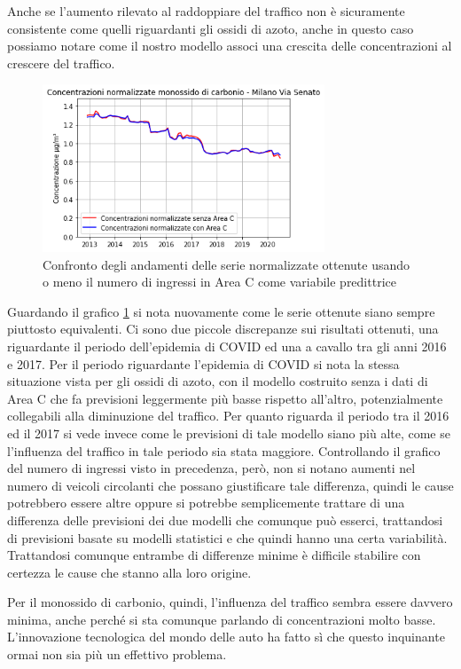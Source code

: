 Anche se l'aumento rilevato al raddoppiare del traffico non è sicuramente consistente come quelli riguardanti gli ossidi di azoto, anche in questo caso possiamo notare come il nostro modello associ una crescita delle concentrazioni al crescere del traffico. 

\begin{figure}[h]
\centering
\includegraphics[width=0.75\textwidth]{co_areac}
\caption{Confronto degli andamenti delle serie normalizzate ottenute usando o meno il numero di ingressi in Area C come variabile predittrice}
\label{fig:co_areac}
\end{figure}

Guardando il grafico \ref{fig:co_areac} si nota nuovamente come le serie ottenute siano sempre piuttosto equivalenti. Ci sono due piccole discrepanze sui risultati ottenuti, una riguardante il periodo dell'epidemia di COVID ed una a cavallo tra gli anni 2016 e 2017.
Per il periodo riguardante l'epidemia di COVID si nota la stessa situazione vista per gli ossidi di azoto, con il modello costruito senza i dati di Area C che fa previsioni leggermente più basse rispetto all'altro, potenzialmente collegabili alla diminuzione del traffico. Per quanto riguarda il periodo tra il 2016 ed il 2017 si vede invece come le previsioni di tale modello siano più alte, come se l'influenza del traffico in tale periodo sia stata maggiore. Controllando il grafico del numero di ingressi visto in precedenza, però, non si notano aumenti nel numero di veicoli circolanti che possano giustificare tale differenza, quindi le cause potrebbero essere altre oppure si potrebbe semplicemente trattare di una differenza delle previsioni dei due modelli che comunque può esserci, trattandosi di previsioni basate su modelli statistici e che quindi hanno una certa variabilità.
Trattandosi comunque entrambe di differenze minime è difficile stabilire con certezza le cause che stanno alla loro origine.

Per il monossido di carbonio, quindi, l'influenza del traffico sembra essere davvero minima, anche perché si sta comunque parlando di concentrazioni molto basse. L'innovazione tecnologica del mondo delle auto ha fatto sì che questo inquinante ormai non sia più un effettivo problema.

